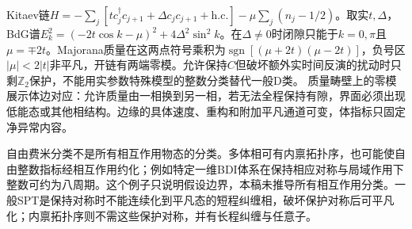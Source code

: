 Kitaev链$H=-\sum_j[tc_j^\dagger c_{j+1}+\Delta c_jc_{j+1}+\mathrm{h.c.}]-\mu\sum_j(n_j-1/2)$。取实$t,\Delta$，BdG谱$E_k^2=(-2t\cos k-\mu)^2+4\Delta^2\sin^2k$。在$\Delta\ne0$时闭隙只能于$k=0,\pi$且$\mu=\mp2t$。Majorana质量在这两点符号乘积为$\operatorname{sgn}[(\mu+2t)(\mu-2t)]$，负号区$|\mu|<2|t|$非平凡，开链有两端零模。允许保持$C$但破坏额外实时间反演的扰动时只剩$\mathbb Z_2$保护，不能用实参数特殊模型的整数分类替代一般D类。
质量畴壁上的零模展示体边对应：允许质量由一相换到另一相，若无法全程保持有隙，界面必须出现低能态或其他相结构。边缘的具体速度、重构和附加平凡通道可变，体指标只固定净异常内容。

自由费米分类不是所有相互作用物态的分类。多体相可有内禀拓扑序，也可能使自由整数指标经相互作用约化；例如特定一维BDI体系在保持相应对称与局域作用下整数可约为八周期。这个例子只说明假设边界，本稿未推导所有相互作用分类。一般SPT是保持对称时不能连续化到平凡态的短程纠缠相，破坏保护对称后可平凡化；内禀拓扑序则不需这些保护对称，并有长程纠缠与任意子。
